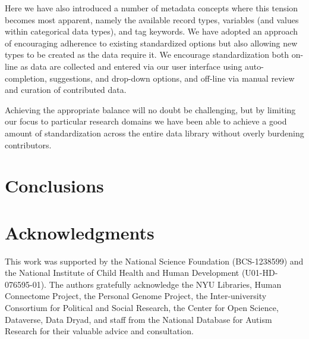 \documentclass{sig-alternate}
\begin{document}
Here we have also introduced a number of metadata concepts where this tension becomes most apparent, namely the available record types, variables (and values within categorical data types), and tag keywords.
We have adopted an approach of encouraging adherence to existing standardized options but also allowing new types to be created as the data require it.
We encourage standardization both on-line as data are collected and entered via our user interface using auto-completion, suggestions, and drop-down options, and off-line via manual review and curation of contributed data.

Achieving the appropriate balance will no doubt be challenging, but by limiting our focus to particular research domains we have been able to achieve a good amount of standardization across the entire data library without overly burdening contributors.


\section{Conclusions}

\section*{Acknowledgments}

This work was supported by the National Science Foundation (BCS-1238599)
and the National Institute of Child Health and Human Development
(U01-HD-076595-01). The authors gratefully acknowledge the NYU
Libraries, Human Connectome Project, the Personal Genome Project, the
Inter-university Consortium for Political and Social Research, the
Center for Open Science, Dataverse, Data Dryad, and staff from the
National Database for Autism Research for their valuable advice and
consultation.



\end{document}
